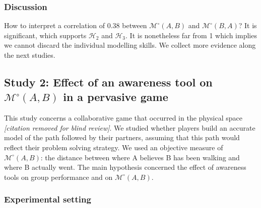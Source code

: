 \documentclass[natbib]{svjour3}
\newcommand{\A}{A\xspace}
\newcommand{\B}{B\xspace}
\newcommand{\gModel}[2]{{$\mathcal{M}^{\circ}(#1, #2)$}}
\begin{document}
\subsubsection*{Discussion}

How to interpret a correlation of 0.38 between \gModel{A}{B} and \gModel{B}{A}?
It is significant, which supports $\mathcal{H}_{2}$ and $\mathcal{H}_{3}$. It is
nonetheless far from 1 which implies we cannot discard the individual modelling
skills. We collect more evidence along the next studies.



\subsection{{\bf Study 2}: Effect of an awareness tool on \gModel{A}{B}  in a pervasive
game}

This study concerns a collaborative game that occurred in the physical
space \textit{[citation removed for blind review]}. We studied whether players
build an accurate model of the path followed by their partners, assuming that this
path would reflect their problem solving strategy. We used an objective measure of
\gModel{A}{B}: the distance between where \A believes \B has been walking and
where \B actually went.  The main hypothesis concerned the effect of awareness
tools on group performance and on \gModel{A}{B}. 

\subsubsection*{Experimental setting}
\end{document}

